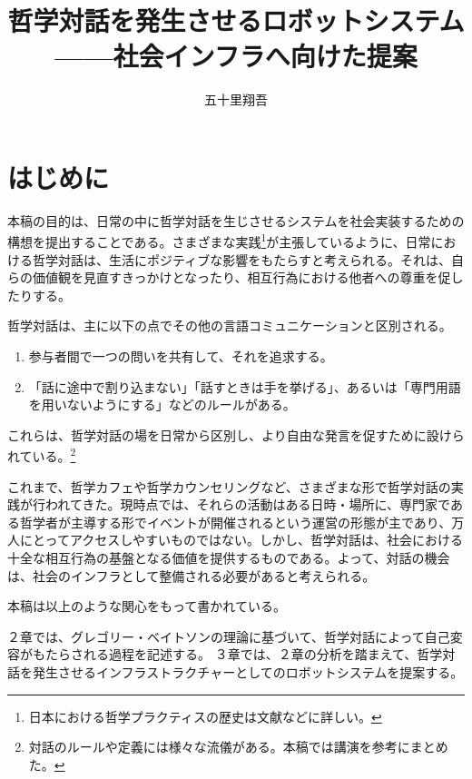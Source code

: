 \documentclass[9pt,b5j,twoside,twocolumn]{utarticle}
\title{哲学対話を発生させるロボットシステム------社会インフラへ向けた提案}
\author{五十里翔吾}
\date{\vspace{-5mm}}
\makeatletter
\def\yakuchu{%
\@ifnextchar[\@xfootnote %
{\stepcounter{yakuchu}%
\protected@xdef\@thefnmark{\theyakuchu}%
\@footnotemark\@footnotetext}}
\makeatother
\begin{document}
\maketitle

\setlength{\footskip}{-2mm}
\chead[]{}
\lfoot[]{\thepage{}}
\cfoot[]{}
\rfoot[\thepage{}]{}

\let\yakuchu=\endnote
\renewcommand{\footnoterule}{\noindent\rule{100mm}{0.3mm}\vskip2mm}
\thispagestyle{fancy}
\section{はじめに}
本稿の目的は、日常の中に哲学対話を生じさせるシステムを社会実装するための構想を提出することである。さまざまな実践\footnote{日本における哲学プラクティスの歴史は文献\cite{DOKU}などに詳しい。}が主張しているように、日常における哲学対話は、生活にポジティブな影響をもたらすと考えられる。それは、自らの価値観を見直すきっかけとなったり、相互行為における他者への尊重を促したりする。


哲学対話は、主に以下の点でその他の言語コミュニケーションと区別される。
\begin{enumerate}
\setlength{\itemsep}{-2mm} 
\renewcommand{\labelenumi}{\pbox<y>{(\arabic{enumi})}}
\item 参与者間で一つの問いを共有して、それを追求する。
\item 「話に途中で割り込まない」「話すときは手を挙げる」、あるいは「専門用語を用いないようにする」などのルールがある。
\end{enumerate}
これらは、哲学対話の場を日常から区別し、より自由な発言を促すために設けられている。\footnote{対話のルールや定義には様々な流儀がある。本稿では講演\cite{TERA}を参考にまとめた。}

これまで、哲学カフェや哲学カウンセリングなど、さまざまな形で哲学対話の実践が行われてきた。現時点では、それらの活動はある日時・場所に、専門家である哲学者が主導する形でイベントが開催されるという運営の形態が主であり、万人にとってアクセスしやすいものではない。しかし、哲学対話は、社会における十全な相互行為の基盤となる価値を提供するものである。よって、対話の機会は、社会のインフラとして整備される必要があると考えられる。


本稿は以上のような関心をもって書かれている。


２章では、グレゴリー・ベイトソンの理論に基づいて、哲学対話によって自己変容がもたらされる過程を記述する。
３章では、２章の分析を踏まえて、哲学対話を発生させるインフラストラクチャーとしてのロボットシステムを提案する。
\end{document}
